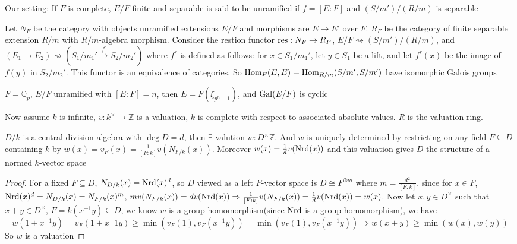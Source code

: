 \documentclass[a4paper,10pt]{article}
\begin{document}
Our setting: If $F$ is complete, $E/F$ finite and separable is said to be unramified if $f=[E:F]$ and $(S/m')/(R/m)$ is separable

\begin{theorem}
Let $N_F$ be the category with objects unramified extensions $E/F$ and morphisms are $E\to E'$ over $F$. $R_F$ be the category of finite separable extension $R/m$ with $R/m$-algebra morphism. Consider the restion functor $\operatorname{res}:N_F\to R_F$, $E/F\rightsquigarrow (S/m')/(R/m)$, and $(E_1\to E_2)\rightsquigarrow(S_1/m_1'\xrightarrow{f^r}S_2/m_2')$ where $f^r$ is defined as follows: for $x\in S_1/m_1'$, let $y\in S_1$ be a lift, and let $f^r(x)$ be the image of $f(y)$ in $S_2/m_2'$. This functor is an equivalence of categories. So $\operatorname{Hom}_F(E,E)=\operatorname{Hom}_{R/m}(S/m',S/m')$ have isomorphic Galois groups
\end{theorem}

\begin{example}
$F=\mathbb Q_p$, $E/F$ unramified with $[E:F]=n$, then $E=F(\xi_{p^n-1})$, and $\operatorname{Gal}(E/F)$ is cyclic
\end{example}

Now assume $k$ is infinite, $v:k^\times\to\mathbb Z$ is a valuation, $k$ is complete with respect to associated absolute values. $R$ is the valuation ring.

\begin{lemma}
$D/k$ is a central division algebra with $\deg D=d$, then $\exists$ valution $w:D^\times\mathbb Z$. And $w$ is uniquely determined by restricting on any field $F\subseteq D$ containing $k$ by $w(x)=v_F(x)=\frac{1}{[F:k]}v(N_{F/k}(x))$. Moreover $w(x)=\frac{1}{d}v(\operatorname{Nrd}(x))$ and this valuation gives $D$ the structure of a normed $k$-vector space
\end{lemma}

\begin{proof}
For a fixed $F\subseteq D$, $N_{D/k}(x)=\operatorname{Nrd}(x)^d$, so $D$ viewed as a left $F$-vector space is $D\cong F^{\oplus m}$ where $m=\frac{d^2}{[F:k]}$. since for $x\in F$, $\operatorname{Nrd}(x)^d=N_{D/k}(x)=N_{F/k}(x)^m$, $mv(N_{F/k}(x))=dv(\operatorname{Nrd}(x))\Rightarrow\frac{1}{[F:k]}v(N_{F/k}(x))=\frac{1}{d}v(\operatorname{Nrd}(x))=w(x)$. Now let $x,y\in D^\times$ such that $x+y\in D^\times$, $F=k(x^{-1}y)\subseteq D$, we know $w$ is a group homomorphism(since $\operatorname{Nrd}$ is a group homomorphism), we have
\[
w(1+x^{-1}y)=v_F(1+x^-1{y})\geq\min(v_F(1),v_F(x^{-1}y))=\min(v_F(1),v_F(x^{-1}y))\Rightarrow w(x+y)\geq\min(w(x),w(y))
\]
So $w$ is a valuation
\end{proof}
\end{document}
